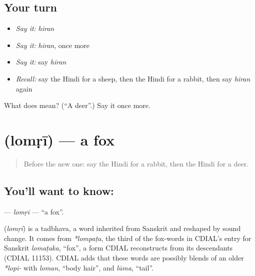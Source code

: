 \subsection*{Your turn}
\begin{itemize}
\raggedright
  \item \emph{Say it:} \emph{hiran}
  \item \emph{Say it:} \emph{hiran}, once more
  \item \emph{Say it:} say \emph{hiran}
  \item \emph{Recall:} say the Hindi for a sheep, then the Hindi for a rabbit, then say \emph{hiran} again
\end{itemize}

\begin{tcolorbox}[breakable,colback=teal!4,colframe=teal!35!black,title={Before you move on}]
What does  mean? (\textquotedblleft{}A deer\textquotedblright{}.) Say it once more.
\end{tcolorbox}
\section[\texorpdfstring{\hi{लोमड़ी} (lomṛī)}{लोमड़ी (lomṛī)}]{ (lomṛī) — a fox}

\label{lesson:HI-C147-lomri}



\begin{quote}
Before the new one: say the Hindi for a rabbit, then the Hindi for a deer.
\end{quote}

\subsection*{You'll want to know: }
\textbf{} — \emph{lomṛī} — \textquotedblleft{}a fox\textquotedblright{}.

\begin{cousinweb}
\textbf{} (\emph{lomṛī}) is a tadbhava, a word inherited from Sanskrit and reshaped by sound change. It comes from \emph{*lompaṭa}, the third of the fox-words in CDIAL's entry for Sanskrit \emph{lomaṭaka}, \textquotedblleft{}fox\textquotedblright{}, a form CDIAL reconstructs from its descendants (CDIAL 11153). CDIAL adds that these words are possibly blends of an older \emph{*lopi-} with \emph{loman}, \textquotedblleft{}body hair\textquotedblright{}, and \emph{lūma}, \textquotedblleft{}tail\textquotedblright{}.
\end{cousinweb}

